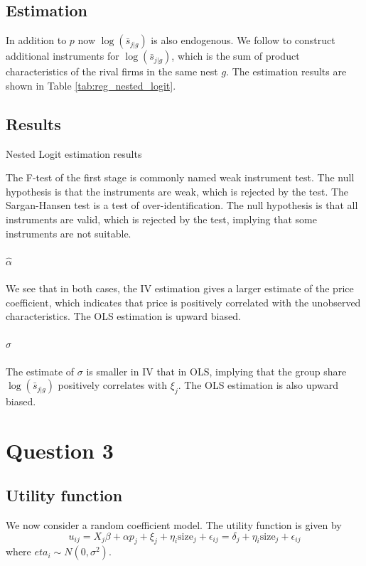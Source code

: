\documentclass[12pt]{article}
\begin{document}
\subsection{Estimation}
In addition to $p$ now $\log(\bar{s}_{j|g})$ is also endogenous. We follow
\citep{berry1994} to construct additional instruments for
$\log(\bar{s}_{j|g})$, which is the sum of product characteristics of the rival
firms in the same nest $g$. The estimation results are shown in Table
\ref{tab:reg_nested_logit}.

\subsection{Results}
\begin{table}[h!]\fontsize{10pt}{12pt}\selectfont
    \centering
    
    \caption{Nested Logit estimation results}
    \label{tab:reg_nested_logit}
\end{table}

The F-test of the first stage is commonly named weak instrument test. The null
hypothesis is that the instruments are weak, which is rejected by the test. The
Sargan-Hansen test is a test of over-identification. The null hypothesis is
that all instruments are valid, which is rejected by the test, implying that
some instruments are not suitable.

\paragraph{$\hat{\alpha}$} We see that in both cases, the IV estimation gives a larger estimate of the price coefficient, which indicates that price is positively correlated with the unobserved characteristics. The OLS estimation is upward biased.
\paragraph{$\hat{\sigma}$} The estimate of $\sigma$ is smaller in IV that in OLS,
implying that the group share $\log(\bar{s}_{j|g})$ positively correlates with
$\xi_j$. The OLS estimation is also upward biased.

\section{Question 3}
\subsection{Utility function}
We now consider a random coefficient model. The utility function is given by
\begin{equation}
    u_{ij}=X_{j}\beta + \alpha p_{j} + \xi_{j}+ \eta_i\text{size}_j+ \epsilon_{ij}=\delta_j+\eta_i\text{size}_j+\epsilon_{ij}
\end{equation}
where $eta_i\sim N(0,\sigma^2)$.
\end{document}
